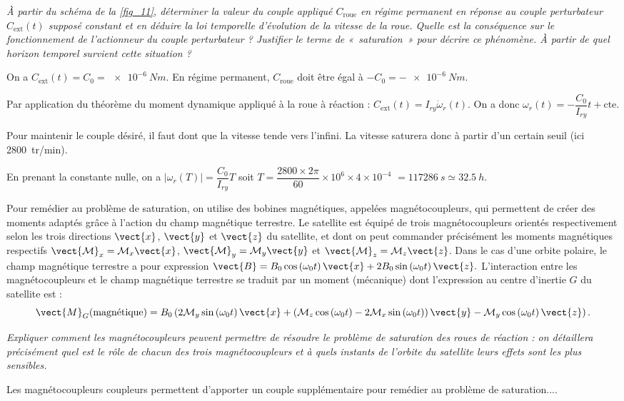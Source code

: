 \question{\label{q_32}}\textit{À partir du schéma de la \autoref{fig_11}, déterminer la valeur du couple appliqué $C_{\text{roue}}$ en régime permanent
en réponse au couple perturbateur $C_{\text{ext}}(t)$ supposé constant et en déduire la loi temporelle d’évolution de la
vitesse de la roue. Quelle est la conséquence sur le fonctionnement de l’actionneur du couple perturbateur ? Justifier le terme de «~saturation~» pour décrire ce phénomène. À partir de quel horizon temporel survient cette
situation ?}
\ifprof
\begin{corrige}
On a $C_{\text{ext}}(t) = C_0 =\SI{e-6}{Nm}$. En régime permanent, $C_{\text{roue}}$ doit être égal à $-C_0 =-\SI{e-6}{Nm}$.

Par application du théorème du moment dynamique appliqué à la roue à réaction : $C_{\text{ext}}(t) = I_{ry} \dot{\omega}_r(t)$. On a donc $\omega_r(t) = -\dfrac{C_0}{I_{ry}}t + \text{cte}$.

Pour maintenir le couple désiré, il faut dont que la vitesse tende vers l'infini. La vitesse saturera donc à partir d'un certain seuil (ici \SI{2800}{tr/min}). 

En prenant la constante nulle, on a  $|\omega_r(T)| = \dfrac{C_0}{I_{ry}}T$ soit $T = \dfrac{2800 \times 2\pi}{60} \times 10^{6} \times 4\times 10 ^{-4} $ $=\SI{117 286}{s} \simeq \SI{32,5}{h}$.


\end{corrige}
\else
\fi

\ifprof
\else


Pour remédier au problème de saturation, on utilise des bobines magnétiques, appelées magnétocoupleurs, qui
permettent de créer des moments adaptés grâce à l’action du champ magnétique terrestre. Le satellite est équipé
de trois magnétocoupleurs orientés respectivement selon les trois directions $\vect{x}$, $\vect{y}$ et $\vect{z}$ du satellite, et dont on peut
commander précisément les moments magnétiques respectifs $\vect{\mathcal{M}}_x=\mathcal{M}_x\vect{x}$, $\vect{\mathcal{M}}_y=\mathcal{M}_y\vect{y}$ et $\vect{\mathcal{M}}_z=\mathcal{M}_z\vect{z}$. Dans
le cas d’une orbite polaire, le champ magnétique terrestre a pour expression $\vect{B}=B_0 \cos\left(\omega_0 t\right) \vect{x} +2 B_0 \sin\left(\omega_0 t\right) \vect{z}.$ L’interaction entre les magnétocoupleurs et le champ magnétique terrestre se traduit par un moment (mécanique)
dont l’expression au centre d’inertie $G$ du satellite est :
$$
\vect{M}_G (\text{magnétique}) = 
B_0 \left( 
2\mathcal{M}_y \sin \left(\omega_0 t \right) \vect{x}
+ \left(
\mathcal{M}_z \cos \left(\omega_0 t \right) 
-2\mathcal{M}_x \sin\left(\omega_0 t \right) \right)\vect{y}
-\mathcal{M}_y \cos \left(\omega_0 t \right) \vect{z}
\right).
$$
\fi

\question{\label{q_33}}\textit{Expliquer comment les magnétocoupleurs peuvent permettre de résoudre le problème de saturation des
roues de réaction : on détaillera précisément quel est le rôle de chacun des trois magnétocoupleurs et à quels
instants de l’orbite du satellite leurs effets sont les plus sensibles.}
\ifprof
\begin{corrige}
Les magnétocoupleurs coupleurs permettent d'apporter un couple supplémentaire pour remédier au problème de saturation.... 
\end{corrige}
\else
\fi